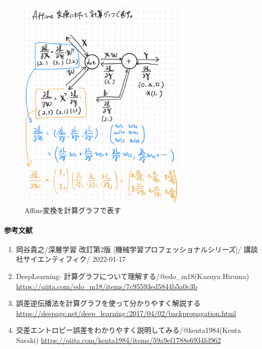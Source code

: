 \documentclass{ltjsarticle}
\begin{document}
\begin{figure}[htbp]
  \centering
  \includegraphics[width=8cm]{./capture/affine_calc_graph.png}
  \caption{Affine変換を計算グラフで表す}
  \label{fig:affine_calc_graph}
\end{figure}
  
\newpage

\paragraph{参考文献}
\begin{enumerate}
  \item 岡谷貴之/深層学習 改訂第2版 [機械学習プロフェッショナルシリーズ]/ 講談社サイエンティフィク/ 2022-01-17
  \item DeepLearning- 計算グラフについて理解する/@edo\_m18(Kazuya Hiruma) \url{https://qiita.com/edo_m18/items/7c95593ed5844b5a0c3b}
  \item 誤差逆伝播法を計算グラフを使って分かりやすく解説する \url{https://deepage.net/deep\_learning/2017/04/02/backpropagation.html}
  \item 交差エントロピー誤差をわかりやすく説明してみる/@kenta1984(Kenta Sasaki) \url{https://qiita.com/kenta1984/items/59a9ef1788e6934fd962}
\end{enumerate}
\end{document}
